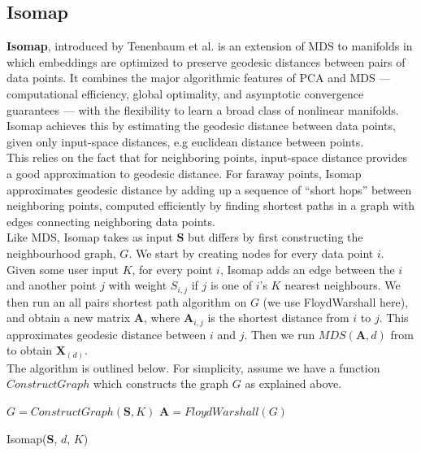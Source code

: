 \documentclass[12pt]{report}
\begin{document}
\newpage

\subsection{Isomap}

\textbf{Isomap}, introduced by Tenenbaum et al. \cite{isomap} is an extension 
of MDS to manifolds in which embeddings 
are optimized to preserve geodesic distances between pairs of data points.
It combines the major algorithmic features of PCA and MDS
— computational efficiency, global optimality, 
and asymptotic convergence guarantees — 
with the flexibility to learn a broad class of nonlinear manifolds.
Isomap achieves this by estimating the geodesic distance between data points, 
given only input-space distances, e.g euclidean distance between points.\\
This relies on the fact that for neighboring points, 
input-space distance provides a good approximation to geodesic distance. 
For faraway points, Isomap approximates geodesic distance 
by adding up a sequence of “short hops” between neighboring points, 
computed efficiently by finding shortest paths in a graph with edges 
connecting neighboring data points.\\

Like MDS, Isomap takes as input $\mathbf{S}$ but differs by first 
constructing the neighbourhood graph, $G$. We start by creating nodes for every 
data point $i$. Given some user input $K$,
for every point $i$, Isomap adds an edge between
the $i$ and another point $j$ with weight $S_{i,j}$ if $j$ is 
one of $i$'s $K$ nearest neighbours. We then run an all pairs shortest path 
algorithm on $G$ (we use FloydWarshall here), and obtain a new matrix 
$\mathbf{A}$, where $\mathbf{A}_{i,j}$ is the shortest distance from $i$ to $j$. 
This approximates geodesic distance between $i$ and $j$. 
Then we run $MDS(\mathbf{A}, d)$ from to obtain $\mathbf{X}_{(d)}$. \\
The algorithm is outlined below. For simplicity, 
assume we have a function $ConstructGraph$ which 
constructs the graph $G$ as explained above.
\begin{algorithm}
    $G = ConstructGraph(\mathbf{S}, K)$\;
    $\mathbf{A} = FloydWarshall(G)$\;
    \caption{Isomap($\mathbf{S}$, $d$, $K$)}
\end{algorithm}
\end{document}
